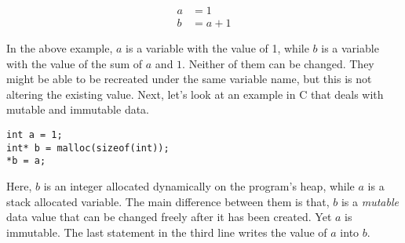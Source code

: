 \begin{align*}
a &= 1 \\
b &= a + 1
\end{align*}

\par In the above example, $a$ is a variable with the value of 1, while $b$ is a variable with the value of the sum of $a$ and $1$. Neither of them can be changed. They might be able to be recreated under the same variable name, but this is not altering the existing value. Next, let's look at an example in C that deals with mutable and immutable data.

\begin{lstlisting}[style=customc]
int a = 1;
int* b = malloc(sizeof(int));
*b = a;
\end{lstlisting}

\par Here, $b$ is an integer allocated dynamically on the program's heap, while $a$ is a stack allocated variable. The main difference between them is that, $b$ is a \emph{mutable} data value that can be changed freely after it has been created. Yet $a$ is immutable. The last statement in the third line writes the value of $a$ into $b$. 